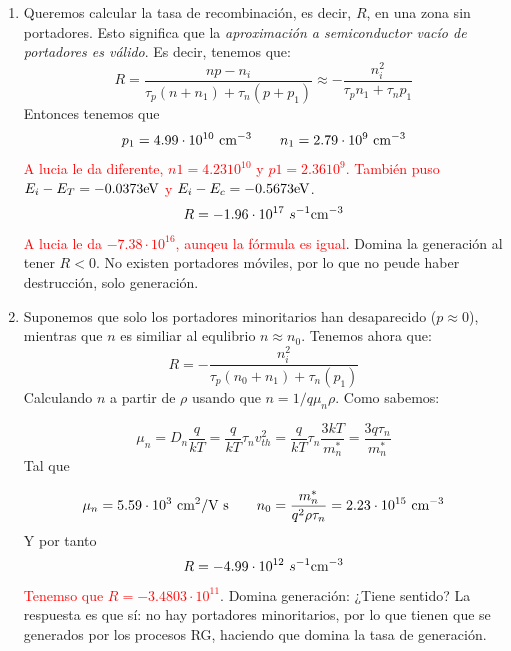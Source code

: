 \begin{enumerate}[label=\alph*)]
	\item Queremos calcular la tasa de recombinación, es decir, $R$, en una zona sin portadores. Esto significa que la \textit{aproximación a  semiconductor vacío de portadores es válido}. Es decir, tenemos que:
	\begin{equation}
		R = \frac{np-n_i}{\tau_p (n+n_1)+\tau_n (p+p_1)} \approx -\frac{n_i^2}{\tau_p n_1 + \tau_n p_1}
	\end{equation}
	Entonces tenemos que 
	\begin{equation}
		p_1 = 4.99\cdot 10^{10} \ \text{cm}^{-3} \qquad n_1= 2.79\cdot 10^{9} \ \text{cm}^{-3}
	\end{equation}
	\textcolor{red}{A lucia le da diferente, $n1=4.23 10^10$ y $p1=2.36 10^9$. También puso $E_i-E_T=-0.0373 \text{eV}$ y $E_i-E_c=-0.5673\text{eV}$}.
	\begin{equation}
		R = -1.96\cdot 10^{17} \ s^{-1}\text{cm}^{-3}
	\end{equation}
	\textcolor{red}{A lucia le da $-7.38\cdot 10^{16}$, aunqeu la fórmula es igual}. Domina la generación al tener $R<0$. No existen portadores móviles, por lo que no peude haber destrucción, solo generación.
	\item Suponemos que solo los portadores minoritarios han desaparecido ($p\approx 0$), mientras que $n$ es similiar al equlibrio $n\approx n_0$. Tenemos ahora que:
	\begin{equation}
		R = - \frac{n_i^2}{\tau_p(n_0+n_1)+\tau_n(p_1)}
	\end{equation}
	Calculando $n$ a partir de $\rho$ usando que $n = 1/q\mu_n\rho$. Como sabemos:

	\begin{equation}
		\mu_n = D_n  \frac{q}{kT} = \frac{q}{kT}  \tau_n {v_{th}^2} =  \frac{q}{kT}  \tau_n \frac{3kT}{m_n^*} = \frac{3q\tau_n}{ m_n^*} 
	\end{equation}
	Tal que 

	\begin{equation}
		\mu_n=5.59 \cdot 10^3  \ \text{cm}^2 /  \text{V s}  \qquad n_0 = \frac{m_n^*}{q^2\rho \tau_n} = 2.23 \cdot 10^{15} \ \text{cm}^{-3}
	\end{equation}
	Y por tanto
	\begin{equation}
		R = -4.99 \cdot 10^{12} \ s^{-1}\text{cm}^{-3}
	\end{equation}
	\textcolor{red}{Tenemso que $R=-3.4803\cdot 10^{11}$}. Domina generación: ¿Tiene sentido? La respuesta es que sí: no hay portadores minoritarios, por lo que tienen que se generados por los procesos RG, haciendo que domina la tasa de generación. 
\end{enumerate}	


